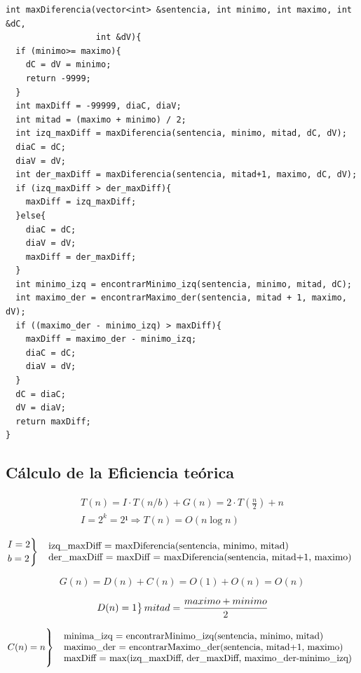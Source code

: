 \documentclass[12pt, spanish]{article}
\begin{document}
\begin{verbatim}
int maxDiferencia(vector<int> &sentencia, int minimo, int maximo, int &dC,
                  int &dV){
  if (minimo>= maximo){
  	dC = dV = minimo;
  	return -9999;
  }
  int maxDiff = -99999, diaC, diaV;
  int mitad = (maximo + minimo) / 2;
  int izq_maxDiff = maxDiferencia(sentencia, minimo, mitad, dC, dV);
  diaC = dC;
  diaV = dV;
  int der_maxDiff = maxDiferencia(sentencia, mitad+1, maximo, dC, dV);
  if (izq_maxDiff > der_maxDiff){
  	maxDiff = izq_maxDiff;
  }else{
  	diaC = dC;
  	diaV = dV;
  	maxDiff = der_maxDiff;
  }
  int minimo_izq = encontrarMinimo_izq(sentencia, minimo, mitad, dC);
  int maximo_der = encontrarMaximo_der(sentencia, mitad + 1, maximo, dV);
  if ((maximo_der - minimo_izq) > maxDiff){
  	maxDiff = maximo_der - minimo_izq;
  	diaC = dC;
  	diaV = dV;
  }
  dC = diaC;
  dV = diaV;
  return maxDiff;
}
\end{verbatim}

\subsection{Cálculo de la Eficiencia teórica}

\begin{gather*}
  T(n) = I \cdot T(n/b) + G(n) = 2 \cdot T(\frac{n}{2}) + n \\
  I = 2^k = 2¹ \Rightarrow T(n) = O(n\log{n})
\end{gather*}

\[
  \begin{rcases*}
    I=2 \\
    b=2
    \end{rcases*}
  \
  \begin{tabular}{l}
     izq\_maxDiff = maxDiferencia(sentencia, minimo, mitad) \\
     der\_maxDiff = maxDiff = maxDiferencia(sentencia, mitad+1, maximo)
  \end{tabular}
\]

\[
 G(n) = D(n) + C(n) = O(1) + O(n) = O(n)
\]

\[
  \begin{rcases*}
    D(n) = 1
  \end{rcases*}
  mitad = \frac{maximo+minimo}{2}
\]

\[
  \begin{rcases*}
    \ \\
    C(n) = n \\
    \
    \end{rcases*}
  \
  \begin{tabular}{l}
  minima\_izq = encontrarMinimo\_izq(sentencia, minimo, mitad) \\
  maximo\_der = encontrarMaximo\_der(sentencia, mitad+1, maximo) \\
  maxDiff = max(izq\_maxDiff, der\_maxDiff, maximo\_der-minimo\_izq)
  \end{tabular}
\]
\end{document}
